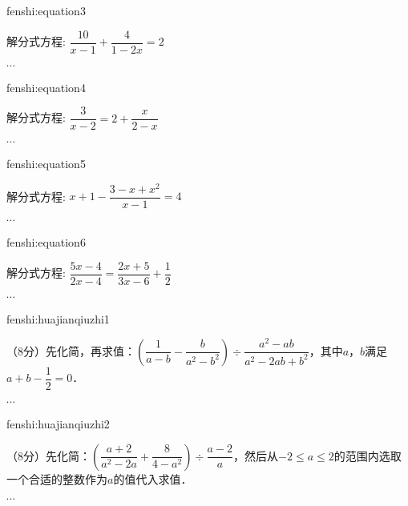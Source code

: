 \begin{defproblem}{fenshi:equation3}%
\begin{onlyproblem}%
解分式方程:
$\dfrac{10}{x-1}+\dfrac{4}{1-2x}=2$
\end{onlyproblem}%
\begin{onlysolution}%
$\cdots$
\end{onlysolution}%
\end{defproblem}


\begin{defproblem}{fenshi:equation4}%
\begin{onlyproblem}%
解分式方程:
$\dfrac{3}{x-2}=2+\dfrac{x}{2-x}$
\end{onlyproblem}%
\begin{onlysolution}%
$\cdots$
\end{onlysolution}%
\end{defproblem}

\begin{defproblem}{fenshi:equation5}%
\begin{onlyproblem}%
解分式方程:
$x+1-\dfrac{3-x+x^2}{x-1}=4$
\end{onlyproblem}%
\begin{onlysolution}%
$\cdots$
\end{onlysolution}%
\end{defproblem}


\begin{defproblem}{fenshi:equation6}%
\begin{onlyproblem}%
解分式方程:
$\dfrac{5x-4}{2x-4}=\dfrac{2x+5}{3x-6}+\dfrac{1}{2}$
\end{onlyproblem}%
\begin{onlysolution}%
$\cdots$
\end{onlysolution}%
\end{defproblem}



\begin{defproblem}{fenshi:huajianqiuzhi1}%
\begin{onlyproblem}%
（8分）先化简，再求值：$\left(\dfrac{1}{a-b}-\dfrac{b}{a^2-b^2}\right)\div \dfrac{a^2-ab}{a^2-2ab+b^2}$，其中$a$，$b$满足$a+b-\dfrac{1}{2}=0$．
\end{onlyproblem}%
\begin{onlysolution}%
$\cdots$
\end{onlysolution}%
\end{defproblem}
\begin{defproblem}{fenshi:huajianqiuzhi2}%
\begin{onlyproblem}%
（8分）先化简：$\left(\dfrac{a+2}{a^2-2a}+\dfrac{8}{4-a^2}\right)\div \dfrac{a-2}{a}$，然后从$-2\leqslant a\leqslant 2$的范围内选取一个合适的整数作为$a$的值代入求值．
\end{onlyproblem}%
\begin{onlysolution}%
$\cdots$
\end{onlysolution}%
\end{defproblem}


